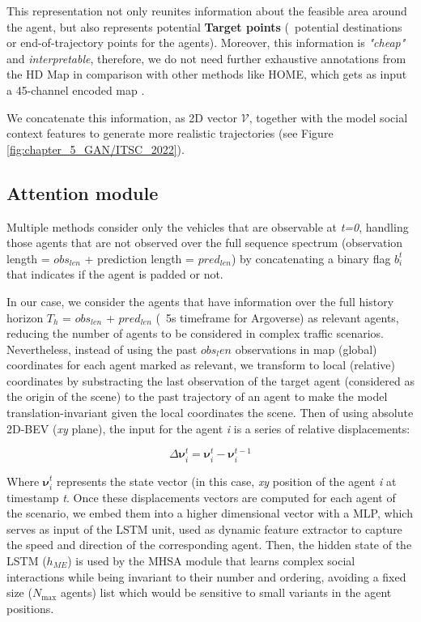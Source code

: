 This representation not only reunites information about the feasible area around the agent, but also represents potential \textbf{Target points} \cite{dendorfer2020goal} (\ie \ potential destinations or end-of-trajectory points for the agents). Moreover, this information is \textit{"cheap"} and \textit{interpretable}, therefore, we do not need further exhaustive annotations from the HD Map in comparison with other methods like HOME, which gets as input a 45-channel encoded map \cite{gilles2021home}.

We concatenate this information, as 2D vector $\mathcal{V}$, together with the model social context features to generate more realistic trajectories (see Figure \ref{fig:chapter_5_GAN/ITSC_2022}).

\subsection{Attention module}
\label{subsec:5_attention_module}

Multiple methods \cite{liang2020learning, schmidt2022crat} consider only the vehicles that are observable at \textit{t=0}, handling those agents that are not observed over the full sequence spectrum (observation length = \textit{$obs_{len}$} + prediction length = \textit{$pred_{len}$}) by concatenating a binary flag $b_i^t$ that indicates if the agent is padded or not. 

In our case, we consider the agents that have information over the full history horizon $T_h$ = \textit{$obs_{len}$} + \textit{$pred_{len}$} (\eg \ 5s timeframe for Argoverse) as relevant agents, reducing the number of agents to be considered in complex traffic scenarios. Nevertheless, instead of using the past $obs_len$ observations in map (global) coordinates for each agent marked as relevant, we transform to local (relative) coordinates by substracting the last observation of the target agent (considered as the origin of the scene) to the past trajectory of an agent to make the model translation-invariant given the local coordinates the scene. Then of using absolute 2D-BEV (\textit{xy} plane), the input for the agent \textit{i} is a series of relative displacements:

\begin{equation}
	\Delta \boldsymbol{\nu}^{t}_i = \boldsymbol{\nu}^{t}_i - \boldsymbol{\nu}^{t-1}_i
\end{equation}

Where $\boldsymbol{\nu}^{t}_i$ represents the state vector (in this case, \textit{xy} position of the agent \textit{i} at timestamp \textit{t}. Once these displacements vectors are computed for each agent of the scenario, we embed them into a higher dimensional vector with a \ac{MLP}, which serves as input of the \ac{LSTM} unit, used as dynamic feature extractor to capture the speed and direction of the corresponding agent. Then, the hidden state of the LSTM ($h_{M\!E}$) is used by the MHSA module that learns complex social interactions while being invariant to their number and ordering, avoiding a fixed size ($N_{\text{max}}$ agents) list which would be sensitive to small variants in the agent positions.

